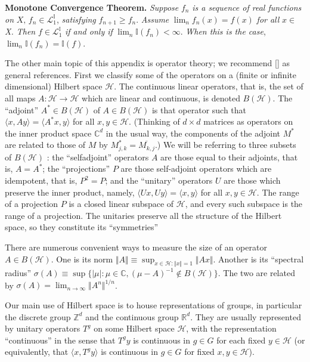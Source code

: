 \documentclass[reqno]{stml-l}
\theoremstyle{plain}
\theoremstyle{definition}
\numberwithin{equation}{chapter}
\begin{document}
\noindent \textbf{Monotone Convergence Theorem.} \emph{Suppose} $f_{n}$ \emph{is a sequence of real functions on} $X,\,f_{n}\in \mathcal{L}_{1}^{\mathbb{I}}$, \emph{satisfying} $f_{n+1}\geq f_{n}$. \emph{Assume} $\lim_{n}f_{n}(x)=f(x)$ \emph{for all} $x\in$ \emph{X. Then} $f\in \mathcal{L}_{1}^{\mathbb{I}}$ \emph{if and only if} $\lim_{n}\mathbb{I}(f_{n})<\infty$. \emph{When this is the case}, $\lim_{n}\mathbb{I}(f_{n})=\mathbb{I}(f)$.

The other main topic of this appendix is operator theory; we recommend [] as general references. First we classify some of the operators on a (finite or infinite dimensional) Hilbert space $\mathcal{H}$. The continuous linear operators, that is, the set of all maps $A:\mathcal{H}\longrightarrow \mathcal{H}$ which are linear and continuous, is denoted $B(\mathcal{H})$. The ``adjoint'' $A^{\ast}\in B(\mathcal{H})$ of $A\in B(\mathcal{H})$ is that operator such that $\langle x,Ay\rangle=\langle A^{\ast}x, y\rangle$ for all $x,y\in \mathcal{H}$. (Thinking of $d\times d$ matrices as operators on the inner product space $\mathbb{C}^{d}$ in the usual way, the components of the adjoint $M^{\ast}$ are related to those of $M$ by $M_{j,k}^{\ast}= \overline{M_{k,j}}$.) We will be referring to three subsets of $B(\mathcal{H})$ : the ``selfadjoint'' operators $A$ are those equal to their adjoints, that is, $A= A^{\ast}$; the ``projections'' $P$ are those self-adjoint operators which are idempotent, that is, $P^{2}=P$; and the ``unitary'' operators $U$ are those which preserve the inner product, namely, $\langle Ux,Uy\rangle=\langle x, y\rangle$ for all $x,y\in \mathcal{H}$. The range of a projection $P$ is a closed linear subspace of $\mathcal{H}$, and every such subspace is the range of a projection. The unitaries preserve all the structure of the Hilbert space, so they constitute its ``symmetries''

There are numerous convenient ways to measure the size of an operator $A\in B(\mathcal{H})$. One is its norm $\Vert A\Vert\equiv\sup_{x\in \mathcal{H}:\Vert x\Vert=1}\Vert Ax\Vert$. Another is its ``spectral radius'' $\sigma(A)\equiv\sup\{|\mu|:\mu\in \mathbb{C},(\mu-A)^{-1}\not\in B(\mathcal{H})\}$. The two are related by $\sigma(A)=\lim_{n\rightarrow\infty}\Vert A^{n}\Vert^{1/n}$.

Our main use of Hilbert space is to house representations of groups, in particular the discrete group $\mathbb{Z}^{d}$ and the continuous group $\mathbb{R}^{d}$. They are usually represented by unitary operators $T^{g}$ on some Hilbert space $\mathcal{H}$, with the representation ``continuous'' in the sense that $T^{g}y$ is continuous in $g\in G$ for each fixed $y\in \mathcal{H}$ (or equivalently, that $\langle x, T^{g}y\rangle$ is continuous in $g\in G$ for fixed $x,y\in \mathcal{H}$).
\end{document}
